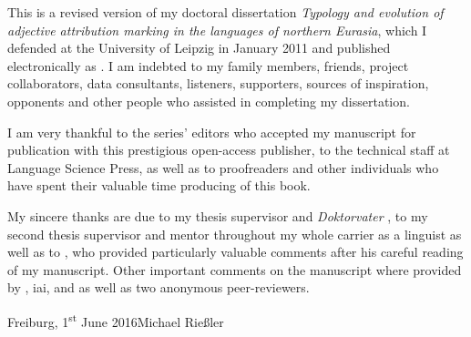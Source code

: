 

This is a revised version of my doctoral dissertation \textit{Typology and evolution of adjective attribution marking in the languages of northern Eurasia}, which I defended at the University of Leipzig in January 2011 and published electronically as \citet{riesler2011a}. I am indebted to my family members, friends, project collaborators, data consultants, listeners, supporters, sources of inspiration, opponents and other people who assisted in completing my dissertation. 

I am very thankful to the series’ editors who accepted my manuscript for publication with this prestigious open-access publisher, to the technical staff at Language Science Press, as well as to proofreaders and other individuals who have spent their valuable time producing of this book. 

My sincere thanks are due to my thesis supervisor and \emph{Doktorvater} , to my second thesis supervisor and mentor throughout my whole carrier as a linguist  as well as to , who provided particularly valuable comments after his careful reading of my manuscript. Other important comments on the manuscript where provided by , iai,  and  as well as two anonymous peer-reviewers.

\bigskip

\noindent
Freiburg, 1\textsuperscript{st} June 2016\hfill Michael Rießler

